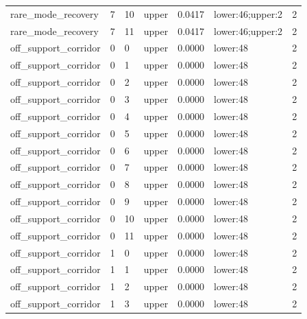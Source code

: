 \documentclass{article}
\begin{document}
\begin{table}[tbp]
{\begin{tabular}{lllllll}
rare\_mode\_recovery & 7 & 10 & upper & 0.0417 & lower:46;upper:2 & 2 \\
rare\_mode\_recovery & 7 & 11 & upper & 0.0417 & lower:46;upper:2 & 2 \\
off\_support\_corridor & 0 & 0 & upper & 0.0000 & lower:48 & 2 \\
off\_support\_corridor & 0 & 1 & upper & 0.0000 & lower:48 & 2 \\
off\_support\_corridor & 0 & 2 & upper & 0.0000 & lower:48 & 2 \\
off\_support\_corridor & 0 & 3 & upper & 0.0000 & lower:48 & 2 \\
off\_support\_corridor & 0 & 4 & upper & 0.0000 & lower:48 & 2 \\
off\_support\_corridor & 0 & 5 & upper & 0.0000 & lower:48 & 2 \\
off\_support\_corridor & 0 & 6 & upper & 0.0000 & lower:48 & 2 \\
off\_support\_corridor & 0 & 7 & upper & 0.0000 & lower:48 & 2 \\
off\_support\_corridor & 0 & 8 & upper & 0.0000 & lower:48 & 2 \\
off\_support\_corridor & 0 & 9 & upper & 0.0000 & lower:48 & 2 \\
off\_support\_corridor & 0 & 10 & upper & 0.0000 & lower:48 & 2 \\
off\_support\_corridor & 0 & 11 & upper & 0.0000 & lower:48 & 2 \\
off\_support\_corridor & 1 & 0 & upper & 0.0000 & lower:48 & 2 \\
off\_support\_corridor & 1 & 1 & upper & 0.0000 & lower:48 & 2 \\
off\_support\_corridor & 1 & 2 & upper & 0.0000 & lower:48 & 2 \\
off\_support\_corridor & 1 & 3 & upper & 0.0000 & lower:48 & 2 \\
\bottomrule
\end{tabular}
}
\end{table}

\clearpage
\end{document}
